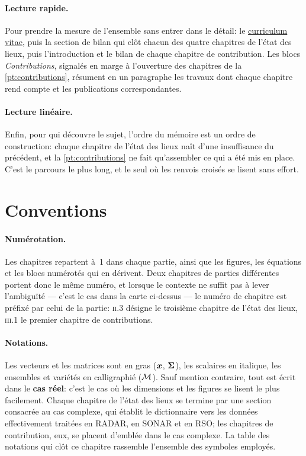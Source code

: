 \paragraph{Lecture rapide.} Pour prendre la mesure de l'ensemble sans entrer
dans le détail: le \hyperref[ch:cv]{curriculum vitae}, puis la section de bilan qui clôt
chacun des quatre chapitres de l'état des lieux, puis l'introduction et le bilan
de chaque chapitre de contribution. Les blocs \textit{Contributions}, signalés
en marge à l'ouverture des chapitres de la \cref{pt:contributions}, résument en
un paragraphe les travaux dont chaque chapitre rend compte et les publications
correspondantes.

\paragraph{Lecture linéaire.} Enfin, pour qui découvre le sujet, l'ordre du
mémoire est un ordre de construction: chaque chapitre de l'état des lieux naît
d'une insuffisance du précédent, et la \cref{pt:contributions} ne fait
qu'assembler ce qui a été mis en place. C'est le parcours le plus long, et le
seul où les renvois croisés se lisent sans effort.

\section*{Conventions}
\label{sec:commentlire-conventions}

\paragraph{Numérotation.} Les chapitres repartent à~1 dans chaque partie, ainsi
que les figures, les équations et les blocs numérotés qui en dérivent. Deux
chapitres de parties différentes portent donc le même numéro, et lorsque le
contexte ne suffit pas à lever l'ambiguïté --- c'est le cas dans la carte
ci-dessus --- le numéro de chapitre est préfixé par celui de la partie:
\textsc{ii}.3 désigne le troisième chapitre de l'état des lieux,
\textsc{iii}.1 le premier chapitre de contributions.

\paragraph{Notations.} Les vecteurs et les matrices sont en gras
($\boldsymbol{x}$, $\boldsymbol{\Sigma}$), les scalaires en italique, les ensembles et variétés en
calligraphié ($\mathcal{M}$). Sauf mention contraire, tout est écrit dans le
\textbf{cas réel}: c'est le cas où les dimensions et les figures se lisent le
plus facilement. Chaque chapitre de l'état des lieux se termine par une section
consacrée au cas complexe, qui établit le dictionnaire vers les données
effectivement traitées en RADAR, en SONAR et en RSO; les chapitres de
contribution, eux, se placent d'emblée dans le cas complexe. La table des
notations qui clôt ce chapitre rassemble l'ensemble des symboles employés.

